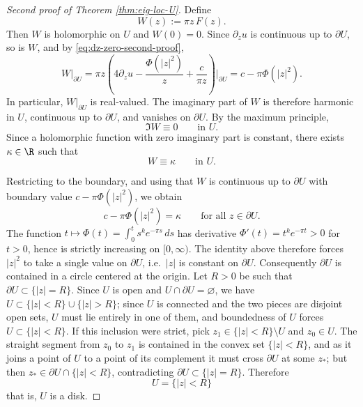 \begin{proof}[Second proof of Theorem \ref{thm:eig-loc-U}]
Define
\[
W(z):=\pi z\,F(z).
\]
Then \(W\) is holomorphic on \(U\) and \(W(0)=0\). Since \(\partial_z u\) is continuous up to
\(\partial U\), so is \(W\), and by \eqref{eq:dz-zero-second-proof},
\[
W|_{\partial U}
=
\pi z\left(4\partial_z u-\frac{\Phi(|z|^2)}{z}+\frac{c}{\pi z}\right)\Big|_{\partial U}
=
c-\pi\Phi(|z|^2).
\]
In particular, \(W|_{\partial U}\) is real-valued. The imaginary part of \(W\) is therefore
harmonic in \(U\), continuous up to \(\partial U\), and vanishes on \(\partial U\). By the
maximum principle,
\[
\Im W\equiv 0
\qquad\text{in }U.
\]
Since a holomorphic function with zero imaginary part is constant, there exists \(\kappa\in\R\)
such that
\[
W\equiv \kappa
\qquad\text{in }U.
\]

Restricting to the boundary, and using that \(W\) is continuous up to \(\partial U\) with
boundary value \(c-\pi\Phi(|z|^2)\), we obtain
\[
c-\pi\Phi(|z|^2)=\kappa
\qquad\text{for all }z\in\partial U.
\]
The function \(t\mapsto \Phi(t)=\int_0^t s^k e^{-\pi s}\,ds\) has derivative
\(\Phi'(t)=t^k e^{-\pi t}>0\) for \(t>0\), hence is strictly increasing on \([0,\infty)\). The
identity above therefore forces \(|z|^2\) to take a single value on \(\partial U\), i.e.\ \(|z|\)
is constant on \(\partial U\). Consequently \(\partial U\) is contained in a circle centered at
the origin. Let \(R>0\) be such that \(\partial U\subset \{|z|=R\}\). Since \(U\) is open and
\(U\cap\partial U=\varnothing\), we have \(U\subset \{|z|<R\}\cup\{|z|>R\}\); since \(U\) is
connected and the two pieces are disjoint open sets, \(U\) must lie entirely in one of them, and
boundedness of \(U\) forces \(U\subset \{|z|<R\}\). If this inclusion were strict, pick
\(z_1\in\{|z|<R\}\setminus U\) and \(z_0\in U\). The straight segment from \(z_0\) to \(z_1\) is
contained in the convex set \(\{|z|<R\}\), and as it joins a point of \(U\) to a point of its
complement it must cross \(\partial U\) at some \(z_*\); but then \(z_*\in\partial U\cap\{|z|<R\}\),
contradicting \(\partial U\subset \{|z|=R\}\). Therefore
\[
U=\{|z|<R\}
\]
that is, \(U\) is a disk.
\end{proof}

